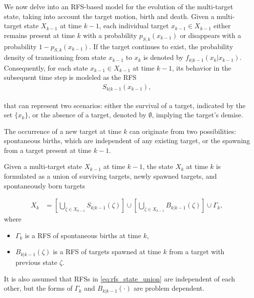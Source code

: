 We now delve into an RFS-based model for the evolution of the multi-target state, taking into account the target motion,
birth and death. Given a multi-target state $X_{k-1}$ at time $k-1$, each individual target $x_{k-1} \in X_{k-1}$
either remains present at time $k$ with a probability $p_{S,k}(x_{k-1})$ or disappears with a probability $1 - p_{S,k}(x_{k-1})$. If the target continues to exist, the probability density of transitioning from state $x_{k-1}$ to $x_k$ is denoted by $f_{k|k-1}(x_k|x_{k-1})$. Consequently, for each state $x_{k-1} \in X_{k-1}$ at time $k-1$, its behavior in the subsequent time step is modeled as the RFS
\begin{align}
    S_{k|k-1}(x_{k-1}),
\end{align}

that can represent two scenarios: either the survival of a target, indicated by the set $\{x_k\}$, or the absence of a
target, denoted by $\emptyset$, implying the target's demise.

The occurrence of a new target at time $k$ can originate from two possibilities: spontaneous births, which are independent of any existing target, or the spawning from a target present at time $k-1$.

Given a multi-target state $X_{k-1}$ at time $k-1$, the state $X_k$ at time $k$ is formulated as a union of
surviving targets, newly spawned targets, and spontaneously born targets

\begin{align}
    X_k &= \left[\bigcup_{\zeta \in X_{k-1}}S_{k|k-1}(\zeta) \right] \cup \left[ \bigcup_{\zeta \in X_{k-1}} B_{k|k-1}(\zeta) \right] \cup \Gamma_k, \label{eq:rfs_state_union}
\end{align}
where
\begin{itemize}
    \item $\Gamma_k$ is a RFS of spontaneous births at time $k$,
    \item $B_{k|k-1}(\zeta)$ is a RFS of targets spawned at time $k$ from a target with previous state $\zeta$.
\end{itemize}
It is also assumed that RFSs in \eqref{eq:rfs_state_union} are independent of each other, but the forms of $\Gamma_k$
and $B_{k|k-1}(\cdot)$ are problem dependent.

